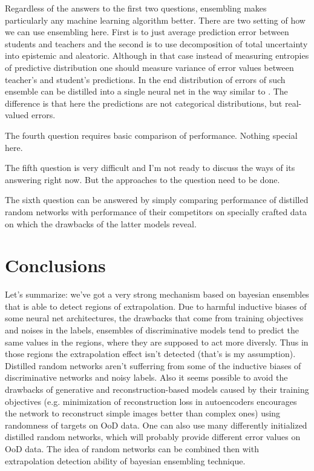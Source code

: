 \documentclass{article}
\begin{document}
    Regardless of the answers to the first two questions, ensembling makes particularly any machine learning algorithm better. There are two setting of how we can use ensembling here. First is to just average prediction error between students and teachers and the second is to use decomposition of total uncertainty into epistemic and aleatoric. Although in that case instead of measuring entropies of predictive distribution one should measure variance of error values between teacher's and student's predictions. In the end distribution of errors of such ensemble can be distilled into a single neural net in the way similar to \cite{end2}. The difference is that here the predictions are not categorical distributions, but real-valued errors.

    The fourth question requires basic comparison of performance. Nothing special here.

    The fifth question is very difficult and I'm not ready to discuss the ways of its answering right now. But the approaches to the question need to be done.

    The sixth question can be answered by simply comparing performance of distilled random networks with performance of their competitors on specially crafted data on which the drawbacks of the latter models reveal.

\section{Conclusions}
    Let's summarize: we've got a very strong mechanism based on bayesian ensembles that is able to detect regions of extrapolation. Due to harmful inductive biases of some neural net architectures, the drawbacks that come from training objectives and noises in the labels, ensembles of discriminative models tend to predict the same values in the regions, where they are supposed to act more diversly. Thus in those regions the extrapolation effect isn't detected (that's is my assumption). Distilled random networks \cite{random_network} aren't sufferring from some of the inductive biases of discriminative networks and noisy labels. Also it seems possible to avoid the drawbacks of generative and reconstruction-based models caused by their training objectives (e.g. minimization of reconstruction loss in autoencoders encourages the network to reconstruct simple images better than complex ones) using randomness of targets on OoD data. One can also use many differently initialized distilled random networks, which will probably provide different error values on OoD data. The idea of random networks can be combined then with extrapolation detection ability of bayesian ensembling technique.



\end{document}
